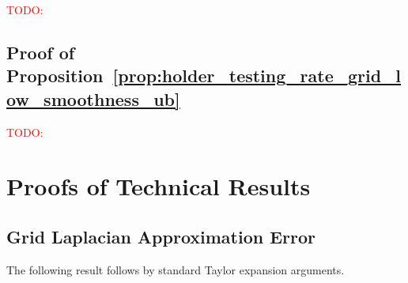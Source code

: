 \documentclass{article}
\newcommand{\1}{\mathbf{1}}
\theoremstyle{alden}
\theoremstyle{aldenthm}
\theoremstyle{definition}
\theoremstyle{remark}
\begin{document}
\textcolor{red}{TODO:}

\subsection{Proof of Proposition~\ref{prop:holder_testing_rate_grid_low_smoothness_ub}}

\textcolor{red}{TODO:}
 
\section{Proofs of Technical Results}

\subsection{Grid Laplacian Approximation Error}

The following result follows by standard Taylor expansion arguments.
\end{document}
